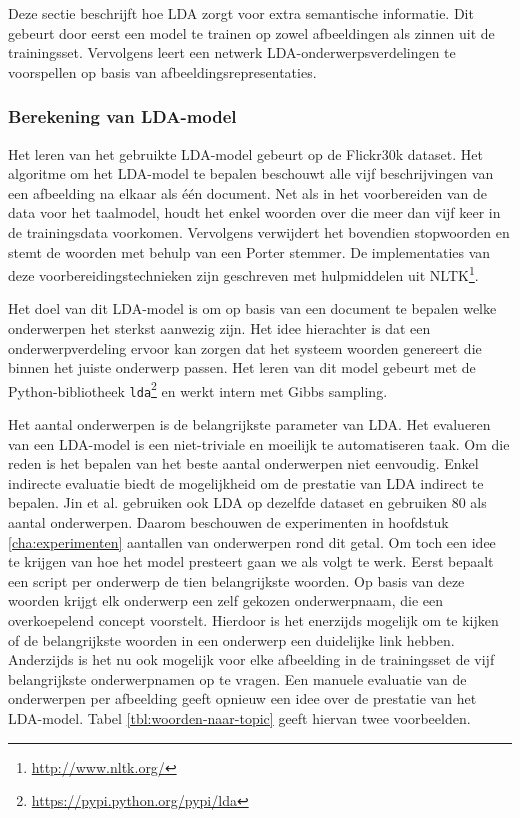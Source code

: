 Deze sectie beschrijft hoe LDA zorgt voor extra semantische informatie. Dit gebeurt door eerst een model te trainen op zowel afbeeldingen als zinnen uit de trainingsset. Vervolgens leert een netwerk LDA-onderwerpsverdelingen te voorspellen op basis van afbeeldingsrepresentaties.

\subsubsection{Berekening van LDA-model}
\label{subs:Berekening van onderwerpverdeling}
Het leren van het gebruikte LDA-model gebeurt op de Flickr30k dataset. Het algoritme om het LDA-model te bepalen beschouwt alle vijf beschrijvingen van een afbeelding na elkaar als \'e\'en document. Net als in het voorbereiden van de data voor het taalmodel, houdt het enkel woorden over die meer dan vijf keer in de trainingsdata voorkomen. Vervolgens verwijdert het bovendien stopwoorden en stemt de woorden met behulp van een Porter stemmer. De implementaties van deze voorbereidingstechnieken zijn geschreven met hulpmiddelen uit NLTK\footnote{\url{http://www.nltk.org/}}.

Het doel van dit LDA-model is om op basis van een document te bepalen welke onderwerpen het sterkst aanwezig zijn. Het idee hierachter is dat een onderwerpverdeling ervoor kan zorgen dat het systeem woorden genereert die binnen het juiste onderwerp passen. Het leren van dit model gebeurt met de Python-bibliotheek \texttt{lda}\footnote{\url{https://pypi.python.org/pypi/lda}} en werkt intern met Gibbs sampling.

Het aantal onderwerpen is de belangrijkste parameter van LDA. Het evalueren van een LDA-model is een niet-triviale en moeilijk te automatiseren taak. Om die reden is het bepalen van het beste aantal onderwerpen niet eenvoudig. Enkel indirecte evaluatie biedt de mogelijkheid om de prestatie van LDA indirect te bepalen. Jin et al.\cite{Jin2015} gebruiken ook LDA op dezelfde dataset en gebruiken 80 als aantal onderwerpen. Daarom beschouwen de experimenten in hoofdstuk \ref{cha:experimenten} aantallen van onderwerpen rond dit getal. 
Om toch een idee te krijgen van hoe het model presteert gaan we als volgt te werk. Eerst bepaalt een script per onderwerp de tien belangrijkste woorden. Op basis van deze woorden krijgt elk onderwerp een zelf gekozen onderwerpnaam, die een overkoepelend concept voorstelt. 
Hierdoor is het enerzijds mogelijk om te kijken of de belangrijkste woorden in een onderwerp een duidelijke link hebben. Anderzijds is het nu ook mogelijk voor elke afbeelding in de trainingsset de vijf belangrijkste onderwerpnamen op te vragen. Een manuele evaluatie van de onderwerpen per afbeelding geeft opnieuw een idee over de prestatie van het LDA-model. Tabel \ref{tbl:woorden-naar-topic} geeft hiervan twee voorbeelden. 

